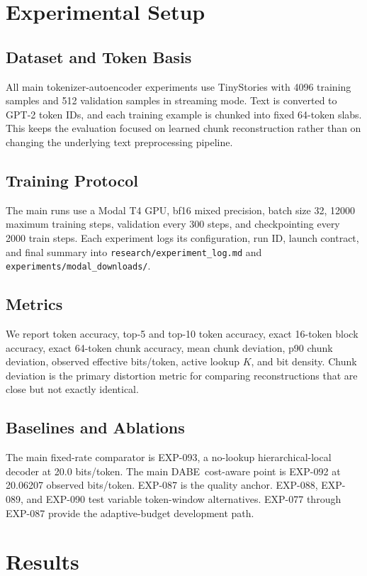 \documentclass[11pt]{article}
\newcommand{\dabe}{\textsc{DABE}}
\newcommand{\Exp}[1]{\textsc{EXP-#1}}
\newcommand{\bitsper}{bits/token}
\begin{document}
\section{Experimental Setup}
\subsection{Dataset and Token Basis}
All main tokenizer-autoencoder experiments use TinyStories with 4096 training samples and 512 validation samples in streaming mode. Text is converted to GPT-2 token IDs, and each training example is chunked into fixed 64-token slabs. This keeps the evaluation focused on learned chunk reconstruction rather than on changing the underlying text preprocessing pipeline.

\subsection{Training Protocol}
The main runs use a Modal T4 GPU, bf16 mixed precision, batch size 32, 12000 maximum training steps, validation every 300 steps, and checkpointing every 2000 train steps. Each experiment logs its configuration, run ID, launch contract, and final summary into \texttt{research/experiment\_log.md} and \texttt{experiments/modal\_downloads/}.

\subsection{Metrics}
We report token accuracy, top-5 and top-10 token accuracy, exact 16-token block accuracy, exact 64-token chunk accuracy, mean chunk deviation, p90 chunk deviation, observed effective \bitsper, active lookup $K$, and bit density. Chunk deviation is the primary distortion metric for comparing reconstructions that are close but not exactly identical.

\subsection{Baselines and Ablations}
The main fixed-rate comparator is \Exp{093}, a no-lookup hierarchical-local decoder at 20.0 \bitsper. The main \dabe\ cost-aware point is \Exp{092} at 20.06207 observed \bitsper. \Exp{087} is the quality anchor. \Exp{088}, \Exp{089}, and \Exp{090} test variable token-window alternatives. \Exp{077} through \Exp{087} provide the adaptive-budget development path.

\section{Results}
\end{document}
